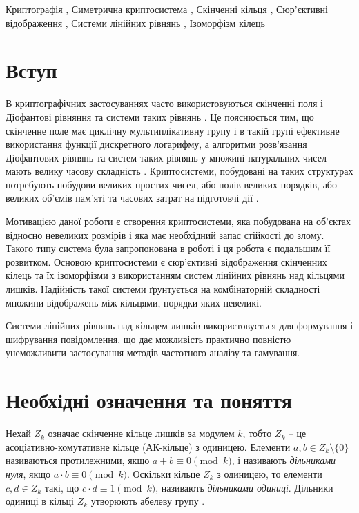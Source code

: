 \documentclass{ceurart}
\begin{document}
\begin{keywords}
  Криптографія \sep %
  Симетрична криптосистема \sep
  Скінченні кільця \sep
  Сюр'єктивні відображення \sep
  Системи лінійних рівнянь \sep
  Ізоморфізм кілець
\end{keywords}

\maketitle


\section{Вступ}
В криптографічних застосуваннях часто використовуються
скінченні поля і Діофантові рівняння та системи таких рівнянь \cite{1,2}.
Це пояснюється тим, що скінченне поле має циклічну мультиплікативну групу
і в такій групі ефективне використання функції дискретного логарифму, а
алгоритми розв'язання Діофантових рівнянь та систем таких рівнянь
у множині натуральних чисел мають велику часову складність \cite{3}.
Криптосистеми, побудовані на таких структурах потребують побудови великих
простих чисел, або полів великих порядків, або великих об'ємів пам'яті
та часових затрат на підготовчі дії \cite{4}.

Мотивацією даної роботи є створення криптосистеми, яка
побудована на об'єктах відносно невеликих розмірів і яка має
необхідний запас стійкості до злому. Такого типу система була
запропонована в роботі \cite{5} і ця робота є подальшим її
розвитком. Основою криптосистеми є сюр'єктивні відображення
скінченних кілець та їх ізоморфізми з використанням систем
лінійних рівнянь над кільцями лишків. Надійність такої системи
ґрунтується на комбінаторній складності множини відображень
між кільцями, порядки яких невеликі.

Системи лінійних рівнянь над кільцем лишків використовується
для формування і шифрування повідомлення, що дає можливість
практично повністю унеможливити застосування методів частотного
аналізу та гамування.

\section{Необхідні означення та поняття}
Нехай \(Z_k\) означає скінченне кільце лишків за модулем
\(k\), тобто \(Z_k\) -- це асоціативно-комутативне кільце (АК-кільце)
з одиницею.
Елементи \(a,b\in Z_k\setminus \{0\}\) називаються протилежними,
якщо \(a+b\equiv 0\pmod{k}\), і називають {\em дільниками нуля},
якщо \(a\cdot b \equiv 0\pmod{k}\). Оскільки кільце \(Z_k\) з одиницею,
то елементи \(c,d \in Z_k\) такі,
що \(c\cdot d \equiv 1\pmod{k}\), називають {\em дільниками одиниці}.
Дільники одиниці в кільці \(Z_k\) утворюють абелеву групу \cite{6}.
\end{document}
